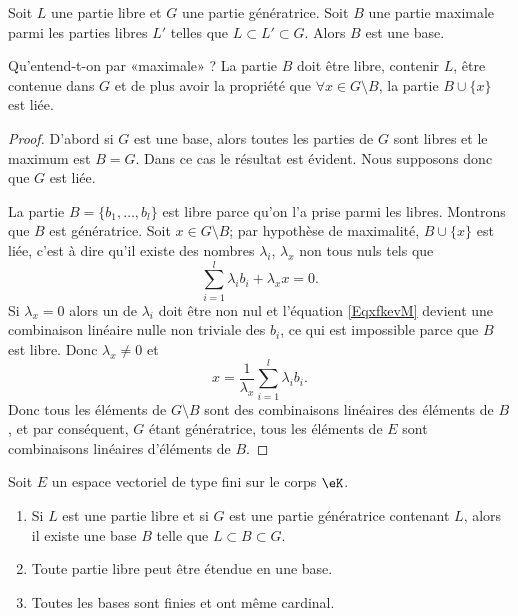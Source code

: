 \begin{lemma}   \label{LemkUfzHl}
    Soit \( L\) une partie libre et \( G\) une partie génératrice. Soit \( B\) une partie maximale parmi les parties libres \( L'\) telles que \( L\subset L'\subset G\). Alors \( B\) est une base.
\end{lemma}
Qu'entend-t-on par «maximale» ? La partie \( B\) doit être libre, contenir \( L\), être contenue dans \( G\) et de plus avoir la propriété que \( \forall x\in G\setminus B\), la partie \( B\cup\{ x \}\) est liée.

\begin{proof}
    D'abord si \( G\) est une base, alors toutes les parties de \( G\) sont libres et le maximum est \( B=G\). Dans ce cas le résultat est évident. Nous supposons donc que \( G\) est liée.

    La partie \( B=\{ b_1,\ldots, b_l \}\) est libre parce qu'on l'a prise parmi les libres. Montrons que \( B\) est génératrice. Soit \( x\in G\setminus B\); par hypothèse de maximalité, \( B\cup\{ x \}\) est liée, c'est à dire qu'il existe des nombres \( \lambda_i\), \( \lambda_x\) non tous nuls tels que
    \begin{equation}    \label{EqxfkevM}
        \sum_{i=1}^l\lambda_ib_i+\lambda_xx=0.
    \end{equation}
    Si \( \lambda_x=0\) alors un de \( \lambda_i\) doit être non nul et l'équation \eqref{EqxfkevM} devient une combinaison linéaire nulle non triviale des \( b_i\), ce qui est impossible parce que \( B\) est libre. Donc \( \lambda_x\neq 0\) et
    \begin{equation}
        x=\frac{1}{ \lambda_x }\sum_{i=1}^l\lambda_ib_i.
    \end{equation}
    Donc tous les éléments de \( G\setminus B\) sont des combinaisons linéaires des éléments de \( B\), et par conséquent, \( G\) étant génératrice, tous les éléments de \( E\) sont combinaisons linéaires d'éléments de \( B\). 
\end{proof}

\begin{theorem} \label{ThonmnWKs}
    Soit \( E\) un espace vectoriel de type fini sur le corps \( \eK\).
    \begin{enumerate}
        \item   \label{ItemBazxTZ}
            Si \( L\) est une partie libre et si \( G\) est une partie génératrice contenant \( L\), alors il existe une base \( B\) telle que \( L\subset B\subset G\).
        \item       \label{ITEMooFVJXooGzzpOu}
            Toute partie libre peut être étendue en une base.
        \item
            Toutes les bases sont finies et ont même cardinal.
    \end{enumerate}
\end{theorem}

